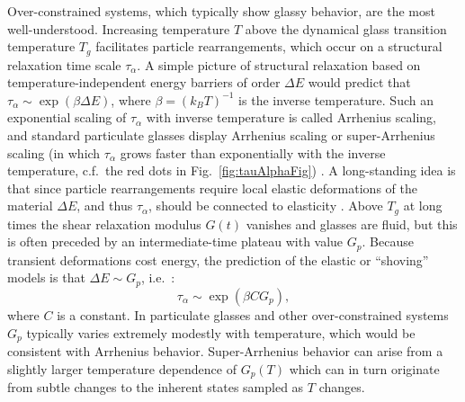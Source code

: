 \documentclass[aps,reprint,superscriptaddress,nofootinbib, notitlepage,prl]{revtex4-2}
\begin{document}
Over-constrained systems, which typically show glassy behavior, are the most well-understood.
Increasing temperature $T$ above the dynamical glass transition temperature $T_g$ facilitates particle rearrangements, which occur on a structural relaxation time scale $\tau_\alpha$.
A simple picture of structural relaxation based on temperature-independent energy barriers of order $\Delta E$ would predict that $\tau_\alpha\sim\exp{(\beta\Delta E)}$, where $\beta = (k_B T)^{-1}$ is the inverse temperature.
Such an exponential scaling of $\tau_\alpha$ with inverse temperature is called Arrhenius scaling, and standard particulate glasses display Arrhenius scaling or super-Arrhenius scaling (in which $\tau_\alpha$ grows faster than exponentially with the inverse temperature, c.f.\ the red dots in Fig.~\ref{fig:tauAlphaFig}) \cite{ediger1996supercooled}.
A long-standing idea is that since particle rearrangements require local elastic deformations of the material $\Delta E$, and thus $\tau_\alpha$, should be connected to elasticity \cite{cavagna2009supercooled,dyre2012instantaneous,puosi2012communication}.
Above $T_g$ at long times the shear relaxation modulus $G(t)$ vanishes and glasses are fluid, but this is often preceded by an intermediate-time plateau with value $G_p$.
Because transient deformations cost energy, the prediction of the elastic or ``shoving'' models is that $\Delta E\sim G_p$, i.e.\ \cite{dyre2012instantaneous,puosi2012communication}:
\begin{equation} 
    \tau_\alpha \sim \exp \left(\beta C G_p\right),\label{eq:shoving} 
\end{equation}
where $C$ is a constant.
In particulate glasses and other over-constrained systems $G_p$ typically varies extremely modestly with temperature, which would be consistent with Arrhenius behavior.
Super-Arrhenius behavior can arise from a slightly larger temperature dependence of $G_p(T)$ which can in turn originate from subtle changes to the inherent states sampled as $T$ changes.
\end{document}
